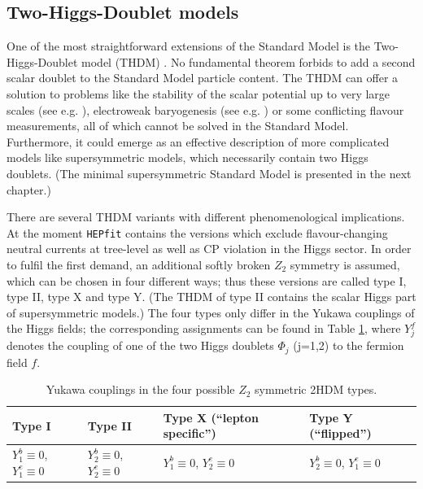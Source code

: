 \documentclass[preprint,3p,12pt]{elsarticle}
\newcommand{\HEPfit}{\texttt{HEPfit}\xspace}
\begin{document}
\subsection{Two-Higgs-Doublet models}
\label{sec:THDM}

One of the most straightforward extensions of the Standard Model is the Two-Higgs-Doublet model (THDM) \cite{Lee:1973iz,Gunion:2002zf,Branco:2011iw}. No fundamental theorem forbids to add a second scalar doublet to the Standard Model particle content. The THDM can offer a solution to problems like the stability of the scalar potential up to very large scales (see e.g. \cite{Chowdhury:2015yja}), electroweak baryogenesis (see e.g. \cite{Bochkarev:1990fx,Nelson:1991ab,Dorsch:2013wja}) or some conflicting flavour measurements, all of which cannot be solved in the Standard Model. Furthermore, it could emerge as an effective description of more complicated models like supersymmetric models, which necessarily contain two Higgs doublets. (The minimal supersymmetric Standard Model is presented in the next chapter.)

There are several THDM variants with different phenomenological implications. At the moment \HEPfit contains the versions which exclude flavour-changing neutral currents at tree-level as well as CP violation in the Higgs sector. In order to fulfil the first demand, an additional softly broken $Z_2$ symmetry is assumed, which can be chosen in four different ways; thus these versions are called type I, type II, type X and type Y. (The THDM of type II contains the scalar Higgs part of supersymmetric models.) The four types only differ in the Yukawa couplings of the Higgs fields; the corresponding assignments can be found in Table \ref{tab:THDMtypes}, where $Y^f_j$ denotes the coupling of one of the two Higgs doublets $\Phi_j$ (j=1,2) to the fermion field $f$.

\begin{table}[htb]
  \centering
\caption{Yukawa couplings in the four possible $Z_2$ symmetric 2HDM types.}\vspace{0.2cm}
  \begin{tabular}{|l|l|l|l|}
    \hline
      Type I & Type II & Type X (``lepton specific'') & Type Y (``flipped'') \\
    \hline
      $Y^b_{1}\equiv 0$, $Y^e_{1}\equiv 0$ & $Y^b_{2}\equiv 0$, $Y^e_{2}\equiv 0$ & $Y^b_{1}\equiv 0$, $Y^e_{2}\equiv 0$ & $Y^b_{2}\equiv 0$, $Y^e_{1}\equiv 0$ \\
      \hline
  \end{tabular}
 \label{tab:THDMtypes}
\end{table} 
\end{document}
